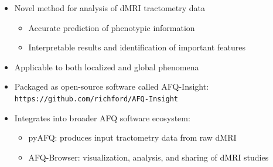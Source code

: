 \documentclass[a0paper,portrait,fontscale=0.395]{baposter}
\begin{document}
\begin{poster}
{\begin{itemize}[nosep, leftmargin=*]
\item Novel method for analysis of dMRI tractometry data

    \begin{itemize}[nosep, leftmargin=*]
    \item Accurate prediction of phenotypic information
    \item Interpretable results and identification of important features
    \end{itemize}

\item Applicable to both localized and global phenomena
\item Packaged as open-source software called AFQ-Insight: \texttt{https://github.com/richford/AFQ-Insight}

\item Integrates into broader AFQ software ecosystem:
    \begin{itemize}[nosep, leftmargin=*]
    \item pyAFQ: produces input tractometry data from raw dMRI
    \item AFQ-Browser: visualization, analysis, and sharing of dMRI studies
    \end{itemize}
\end{itemize}
}





\end{poster}
\end{document}
